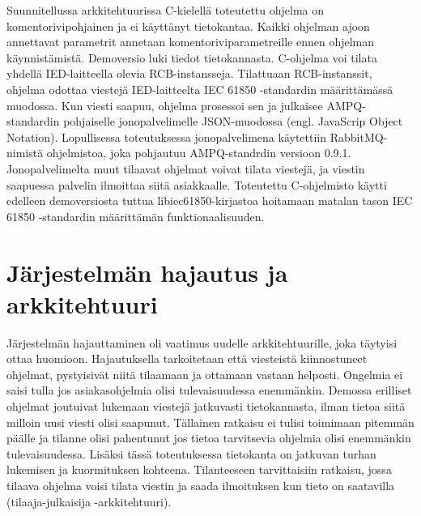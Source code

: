 Suunnitellussa arkkitehtuurissa C-kielellä toteutettu ohjelma on komentorivipohjainen ja ei käyttänyt tietokantaa. Kaikki ohjelman ajoon annettavat parametrit annetaan komentoriviparametreille ennen ohjelman käynnistämistä. Demoversio luki tiedot tietokannasta. C-ohjelma voi tilata yhdellä IED-laitteella olevia RCB-instansseja. Tilattuaan RCB-instanssit, ohjelma odottaa viestejä IED-laitteelta IEC 61850 -standardin määrittämässä muodossa. Kun viesti saapuu, ohjelma prosessoi sen ja julkaisee AMPQ-standardin pohjaiselle jonopalvelimelle JSON-muodossa (engl. JavaScrip Object Notation). Lopullisessa toteutuksessa jonopalvelimena käytettiin RabbitMQ-nimistä ohjelmistoa, joka pohjautuu AMPQ-standrdin versioon 0.9.1. Jonopalvelimelta muut tilaavat ohjelmat voivat tilata viestejä, ja viestin saapuessa palvelin ilmoittaa siitä asiakkaalle. Toteutettu C-ohjelmisto käytti edelleen demoversiosta tuttua libiec61850-kirjastoa hoitamaan matalan tason IEC 61850 -standardin määrittämän funktionaalisuuden.


\section{Järjestelmän hajautus ja arkkitehtuuri}
\label{ch:järjestelmän-hajautus-ja-arkkitehtuuri}
Järjestelmän hajauttaminen oli vaatimus uudelle arkkitehtuurille, joka täytyisi ottaa huomioon. Hajautuksella tarkoitetaan että viesteistä kiinnostuneet ohjelmat, pystyisivät niitä tilaamaan ja ottamaan vastaan helposti. Ongelmia ei saisi tulla jos asiakasohjelmia olisi tulevaisuudessa enemmänkin. Demossa erilliset ohjelmat joutuivat lukemaan viestejä jatkuvasti tietokannasta, ilman tietoa siitä milloin uusi viesti olisi saapunut. Tällainen ratkaisu ei tulisi toimimaan pitemmän päälle ja tilanne olisi pahentunut jos tietoa tarvitsevia ohjelmia olisi enemmänkin tulevaisuudessa. Lisäksi tässä toteutuksessa tietokanta on jatkuvan turhan lukemisen ja kuormituksen kohteena. Tilanteeseen tarvittaisiin ratkaisu, jossa tilaava ohjelma voisi tilata viestin ja saada ilmoituksen kun tieto on saatavilla (tilaaja-julkaisija -arkkitehtuuri).

